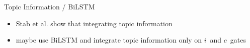 \documentclass[english,handout]{mlutalk}
\newcommand{\BiLSTM}{\mbox{BiLSTM}\xspace}
\begin{document}
\begin{frame}{Topic Information / \BiLSTM}
  
  \begin{itemize}
    \item Stab et al. show that integrating topic information ~\cite{StabMSRG2018}
    \item maybe use \BiLSTM and integrate topic information only on \(i\)~and \(c\)~gates
  \end{itemize}

\end{frame}

\appendix

\section{\appendixname}

\bibliographyframe
\end{document}

